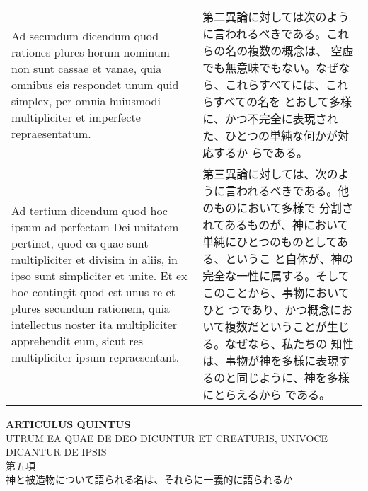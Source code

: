 \documentclass[10pt]{jsarticle} %
\begin{document}
\begin{longtable}{p{21em}p{21em}}
\\


{\sc Ad secundum dicendum} quod rationes plures horum nominum non sunt
cassae et vanae, quia omnibus eis respondet unum quid simplex, per
omnia huiusmodi multipliciter et imperfecte repraesentatum.


&

第二異論に対しては次のように言われるべきである。これらの名の複数の概念は、
空虚でも無意味でもない。なぜなら、これらすべてには、これらすべての名を
とおして多様に、かつ不完全に表現された、ひとつの単純な何かが対応するか
らである。

\\


{\sc Ad tertium dicendum} quod hoc ipsum ad perfectam Dei unitatem
pertinet, quod ea quae sunt multipliciter et divisim in aliis, in ipso
sunt simpliciter et unite. Et ex hoc contingit quod est unus re et
plures secundum rationem, quia intellectus noster ita multipliciter
apprehendit eum, sicut res multipliciter ipsum repraesentant.

&

第三異論に対しては、次のように言われるべきである。他のものにおいて多様で
分割されてあるものが、神において単純にひとつのものとしてある、というこ
と自体が、神の完全な一性に属する。そしてこのことから、事物においてひと
つであり、かつ概念において複数だということが生じる。なぜなら、私たちの
知性は、事物が神を多様に表現するのと同じように、神を多様にとらえるから
である。



\end{longtable}


\newpage
{}
\begin{center}
 {\Large {\bf ARTICULUS QUINTUS}}\\
 {UTRUM EA QUAE DE DEO DICUNTUR ET CREATURIS, UNIVOCE DICANTUR DE IPSIS}
\\{\large 第五項\\神と被造物について語られる名は、それらに一義的に語られるか}
\end{center}
\end{document}

